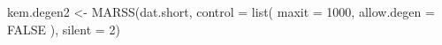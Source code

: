 \begin{Schunk}
\begin{Sinput}
 kem.degen2 <- MARSS(dat.short, control = list(
   maxit = 1000,
   allow.degen = FALSE
 ), silent = 2)
\end{Sinput}
\end{Schunk}

